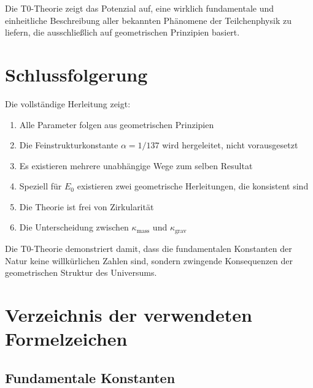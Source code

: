 Die T0-Theorie zeigt das Potenzial auf, eine wirklich fundamentale und einheitliche Beschreibung aller bekannten Phänomene der Teilchenphysik zu liefern, die ausschließlich auf geometrischen Prinzipien basiert.

	\section{Schlussfolgerung}
	
	Die vollständige Herleitung zeigt:
	\begin{enumerate}
		\item Alle Parameter folgen aus geometrischen Prinzipien
		\item Die Feinstrukturkonstante $\alpha = 1/137$ wird hergeleitet, nicht vorausgesetzt
		\item Es existieren mehrere unabhängige Wege zum selben Resultat
		\item Speziell für $E_0$ existieren zwei geometrische Herleitungen, die konsistent sind
		\item Die Theorie ist frei von Zirkularität
		\item Die Unterscheidung zwischen $\kappa_{\text{mass}}$ und $\kappa_{\text{grav}}$
	\end{enumerate}
	
	Die T0-Theorie demonstriert damit, dass die fundamentalen Konstanten der Natur keine willkürlichen Zahlen sind, sondern zwingende Konsequenzen der geometrischen Struktur des Universums.

\appendix
\section{Verzeichnis der verwendeten Formelzeichen}
\label{app:symbols_de}

\subsection{Fundamentale Konstanten}


